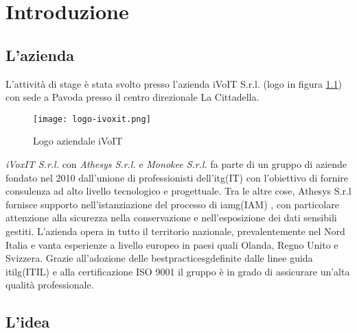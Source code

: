 
\chapter{Introduzione}
\label{cap:introduzione}
\section{L'azienda}

L'attività di stage è stata svolto presso l'azienda iVoIT S.r.l. (logo in figura \ref{fig:Logo-iVoIT}) con sede a Pavoda presso il 
centro direzionale La Cittadella. 
\begin{figure}[!h]
    
    \centering
    \texttt{[image: logo-ivoxit.png]} 
    \caption{Logo aziendale iVoIT}
    \label{fig:Logo-iVoIT} 
\end{figure}
\textit{iVoxIT S.r.l.} con \textit{Athesys S.r.l.} e \textit{Monokee S.r.l.} fa parte di un gruppo di aziende fondato nel 2010 dall’unione di professionisti dell’\gls{itg}\glsfirstoccur (IT) con l’obiettivo di fornire consulenza ad alto livello tecnologico e progettuale. Tra le altre cose, Athesys S.r.l fornisce supporto
nell’istanziazione del processo di \gls{iamg}\glsfirstoccur (IAM) , con particolare
attenzione alla sicurezza nella conservazione e nell’esposizione dei dati sensibili gestiti.
L’azienda opera in tutto il territorio nazionale, prevalentemente nel Nord Italia e
vanta esperienze a livello europeo in paesi quali Olanda, Regno Unito e Svizzera.
Grazie all’adozione delle \gls{bestpracticesg}\glsfirstoccur definite dalle linee guida \gls{itilg}\glsfirstoccur (ITIL)  e alla certificazione ISO 9001 il gruppo è
in grado di assicurare un’alta qualità professionale.

\section{L'idea}


